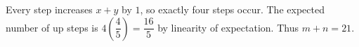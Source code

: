 Every step increases $x+y$ by $1$, so exactly four steps occur. The expected number of up steps is $4(\dfrac{4}{5})=\dfrac{16}{5}$ by linearity of expectation. Thus $\boxed{m+n=21}$.
